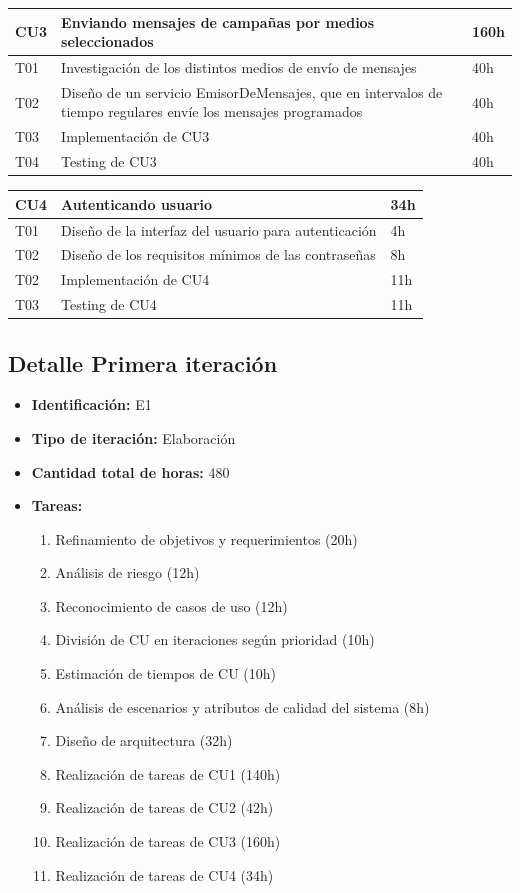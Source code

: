 \documentclass[a4paper, 10pt, twoside]{article}
\begin{document}
\vspace{1em}

\begin{tabular}{lp{13cm}l}
  \hline
  CU3 &  Enviando mensajes de campañas por medios seleccionados & 160h \\
  \hline
  T01 & Investigación de los distintos medios de envío de mensajes & 40h \\
  T02 & Diseño de un servicio EmisorDeMensajes, que en intervalos de tiempo regulares envíe los mensajes programados & 40h \\
  T03 & Implementación de CU3 & 40h \\
  T04 & Testing de CU3 & 40h \\
  \hline
\end{tabular}

\vspace{1em}

\begin{tabular}{lp{13cm}l}
  \hline
  CU4 & Autenticando usuario & 34h \\
  \hline
  T01 & Diseño de la interfaz del usuario para autenticación & 4h \\
  T02 & Diseño de los requisitos mínimos de las contraseñas & 8h \\
  T02 & Implementación de CU4 & 11h \\
  T03 & Testing de CU4 & 11h \\
  \hline
\end{tabular}


\subsection{Detalle Primera iteración}

\begin{itemize}
  \item \textbf{Identificación:} E1
  \item \textbf{Tipo de iteración:} Elaboración
  \item \textbf{Cantidad total de horas:} 480
  \item \textbf{Tareas:}
\begin{enumerate}
  \item Refinamiento de objetivos y requerimientos (20h)
  \item Análisis de riesgo (12h)
  \item Reconocimiento de casos de uso (12h)
  \item División de CU en iteraciones según prioridad (10h)
  \item Estimación de tiempos de CU (10h)
  \item Análisis de escenarios y atributos de calidad del sistema (8h)
  \item Diseño de arquitectura (32h)
  \item Realización de tareas de CU1 (140h)
  \item Realización de tareas de CU2 (42h)
  \item Realización de tareas de CU3 (160h)
  \item Realización de tareas de CU4 (34h)
\end{enumerate}
\end{itemize}
\end{document}
